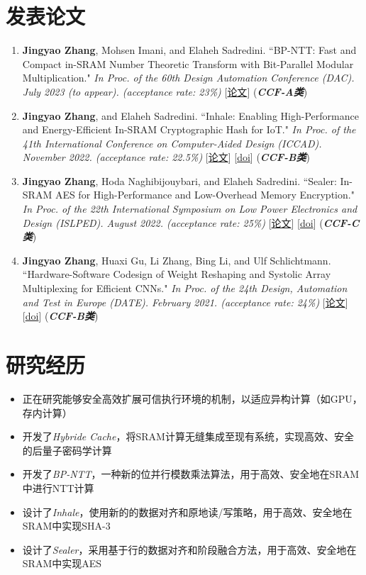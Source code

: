 \documentclass{resume}
\begin{document}
\section{发表论文}
\begin{enumerate}
  \item \textbf{Jingyao Zhang}, Mohsen Imani, and Elaheh Sadredini. ``BP-NTT: Fast and Compact in-SRAM Number Theoretic Transform with Bit-Parallel Modular Multiplication." \textit{In Proc. of the 60th Design Automation Conference (DAC). July 2023 (to appear). (acceptance rate: 23\%)} [\href{https://arxiv.org/pdf/2303.00173.pdf}{论文}] (\textbf{\textit{CCF-A类}}) 
  \item \textbf{Jingyao Zhang}, and Elaheh Sadredini. ``Inhale: Enabling High-Performance and Energy-Efficient In-SRAM Cryptographic Hash for IoT." \textit{In Proc. of the 41th International Conference on Computer-Aided Design (ICCAD). November 2022. (acceptance rate: 22.5\%)} [\href{https://arxiv.org/pdf/2208.07570.pdf}{论文}] [\href{https://dl.acm.org/doi/10.1145/3508352.3549381}{doi}] (\textbf{\textit{CCF-B类}}) 
  \item \textbf{Jingyao Zhang}, Hoda Naghibijouybari, and Elaheh Sadredini. ``Sealer: In-SRAM AES for High-Performance and Low-Overhead Memory Encryption." \textit{In Proc. of the 22th International Symposium on Low Power Electronics and Design (ISLPED). August 2022. (acceptance rate: 25\%)} [\href{https://arxiv.org/pdf/2207.01298.pdf}{论文}] [\href{https://dl.acm.org/doi/10.1145/3531437.3539699}{doi}] (\textbf{\textit{CCF-C类}}) 
  \item \textbf{Jingyao Zhang}, Huaxi Gu, Li Zhang, Bing Li, and Ulf Schlichtmann. ``Hardware-Software Codesign of Weight Reshaping and Systolic Array Multiplexing for Efficient CNNs." \textit{In Proc. of the 24th Design, Automation and Test in Europe (DATE). February 2021. (acceptance rate: 24\%)} [\href{https://drive.google.com/file/d/1vOt_0eP0xW03lu6KngMNexirfjsxyFDI/view}{论文}] [\href{https://ieeexplore.ieee.org/document/9474215}{doi}] (\textbf{\textit{CCF-B类}}) 
\end{enumerate}

\section{研究经历}
\vspace{-8pt}
\begin{itemize}
  \item 正在研究能够安全高效扩展可信执行环境的机制，以适应异构计算（如GPU，存内计算）
  \item 开发了\textit{Hybride Cache}，将SRAM计算无缝集成至现有系统，实现高效、安全的后量子密码学计算
  \item 开发了\textit{BP-NTT}，一种新的位并行模数乘法算法，用于高效、安全地在SRAM中进行NTT计算
  \item 设计了\textit{Inhale}，使用新的的数据对齐和原地读/写策略，用于高效、安全地在SRAM中实现SHA-3
  \item 设计了\textit{Sealer}，采用基于行的数据对齐和阶段融合方法，用于高效、安全地在SRAM中实现AES
\end{itemize}
\end{document}
